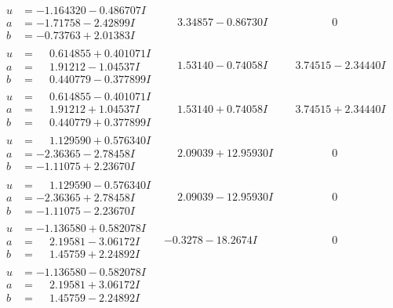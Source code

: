 \documentclass[1p]{elsarticle_modified}
\theoremstyle{definition}
\begin{document}
$$\begin{array}{c|c|c}
\begin{aligned}
u &= -1.164320 - 0.486707 I \\
a &= -1.71758 - 2.42899 I \\
b &= -0.73763 + 2.01383 I\end{aligned}
 & \phantom{-}3.34857 - 0.86730 I & \phantom{-0.000000 } 0 \\ \hline\begin{aligned}
u &= \phantom{-}0.614855 + 0.401071 I \\
a &= \phantom{-}1.91212 - 1.04537 I \\
b &= \phantom{-}0.440779 - 0.377899 I\end{aligned}
 & \phantom{-}1.53140 - 0.74058 I & \phantom{-}3.74515 - 2.34440 I \\ \hline\begin{aligned}
u &= \phantom{-}0.614855 - 0.401071 I \\
a &= \phantom{-}1.91212 + 1.04537 I \\
b &= \phantom{-}0.440779 + 0.377899 I\end{aligned}
 & \phantom{-}1.53140 + 0.74058 I & \phantom{-}3.74515 + 2.34440 I \\ \hline\begin{aligned}
u &= \phantom{-}1.129590 + 0.576340 I \\
a &= -2.36365 - 2.78458 I \\
b &= -1.11075 + 2.23670 I\end{aligned}
 & \phantom{-}2.09039 + 12.95930 I & \phantom{-0.000000 } 0 \\ \hline\begin{aligned}
u &= \phantom{-}1.129590 - 0.576340 I \\
a &= -2.36365 + 2.78458 I \\
b &= -1.11075 - 2.23670 I\end{aligned}
 & \phantom{-}2.09039 - 12.95930 I & \phantom{-0.000000 } 0 \\ \hline\begin{aligned}
u &= -1.136580 + 0.582078 I \\
a &= \phantom{-}2.19581 - 3.06172 I \\
b &= \phantom{-}1.45759 + 2.24892 I\end{aligned}
 & -0.3278 - 18.2674 I & \phantom{-0.000000 } 0 \\ \hline\begin{aligned}
u &= -1.136580 - 0.582078 I \\
a &= \phantom{-}2.19581 + 3.06172 I \\
b &= \phantom{-}1.45759 - 2.24892 I\end{aligned}

\end{array}$$
\end{document}
